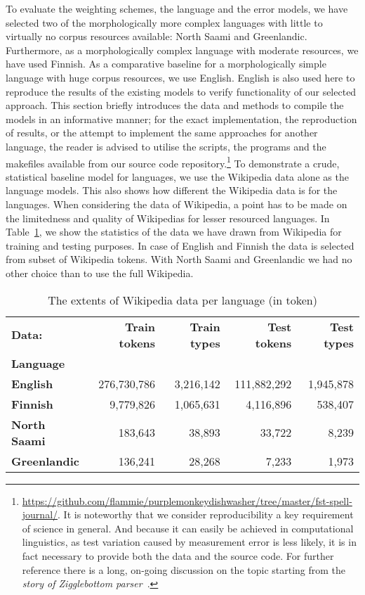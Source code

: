 \documentclass[a4paper,12pt]{article}
\begin{document}
To evaluate the weighting schemes, the language and the error models, we have
selected two of the morphologically more complex languages with little to
virtually no corpus resources available: North Saami and Greenlandic.
Furthermore, as a morphologically complex language with moderate resources, we have
used Finnish. As a comparative baseline for a morphologically simple language
with huge corpus resources, we use English. English is also used here to
reproduce the results of the existing models to verify functionality of our
selected approach. This section briefly introduces the data and methods to
compile the models in an informative manner; for the exact implementation, the
reproduction of results, or the attempt to implement the same approaches for
another language, the reader is advised to utilise the scripts, the programs
and the makefiles available from our source code
repository.\footnote{\url{https://github.com/flammie/purplemonkeydishwasher/tree/master/fst-spell-journal/}.
    It is noteworthy that we consider reproducibility a key requirement of
    science in general. And because it can easily be achieved in computational
    linguistics, as test variation caused by measurement error is less
    likely, it is in fact necessary to provide both the data and the source
    code. For further reference there is
    a long, on-going discussion on the topic starting from
the \emph{story of Zigglebottom
parser}~\cite[]{pedersen2008empiricism,fokkensoffspring}.} To demonstrate a
crude, statistical baseline model for languages, we use the Wikipedia data
alone as the language models. This also shows how different the Wikipedia data
is for the languages. When considering the data of Wikipedia, a point has to
be made on the limitedness and quality of Wikipedias for lesser resourced
languages. In Table~\ref{table:wikipedia-data}, we show the statistics of the
data we have drawn from Wikipedia for training and testing purposes. In case of
English and Finnish the data is selected from subset of Wikipedia tokens. With
North Saami and Greenlandic we had no other choice than to use the full
Wikipedia.

\begin{table}
    \centering
    \begin{tabular}{|l|r|r|r|r|}
        \hline
        \bf Data: & \bf Train tokens & \bf Train types & \bf Test tokens & \bf Test types \\
        \bf Language & & & & \\
        \hline
        \bf English & 276,730,786 & 3,216,142 & 111,882,292 & 1,945,878 \\
        \hline
        \bf Finnish & 9,779,826 & 1,065,631 & 4,116,896 & 538,407 \\
        \hline
        \bf North Saami & 183,643 & 38,893 & 33,722 & 8,239 \\
        \hline
        \bf Greenlandic & 136,241 & 28,268 & 7,233 & 1,973 \\
        \hline
    \end{tabular}
    \caption{The extents of Wikipedia data per language (in token)
    \label{table:wikipedia-data}}
\end{table}
\end{document}
